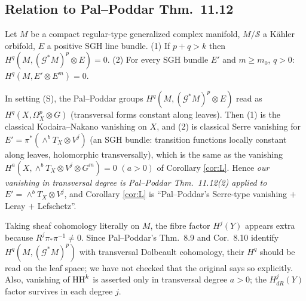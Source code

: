 \subsection{Relation to Pal--Poddar Thm.\ 11.12}\label{sec:PP}
\begin{thm}\tC
Let $M$ be a compact regular-type generalized complex manifold, $M/\mathcal S$ a Kähler orbifold, $E$ a positive SGH line bundle. (1) If $p+q>k$ then $H^q(M,(\mathcal G^*M)^p\otimes E)=0$. (2) For every SGH bundle $E'$ and $m\ge m_0$, $q>0$: $H^q(M,E'\otimes E^m)=0$.
\end{thm}
\begin{prop}\tP\label{prop:PPcompare}
In setting (S), the Pal--Poddar groups $H^q(M,(\mathcal G^*M)^p\otimes E)$ read as $H^q(X,\Omega^p_X\otimes G)$ (transversal forms constant along leaves). Then (1) is the classical Kodaira--Nakano vanishing on $X$, and (2) is classical Serre vanishing for $E'=\pi^*(\wedge^bT_X\otimes V^j)$ (an SGH bundle: transition functions locally constant along leaves, holomorphic transversally), which is the same as the vanishing $H^a(X,\wedge^bT_X\otimes V^j\otimes G^m)=0$ $(a>0)$ of Corollary \ref{cor:L}. Hence \emph{our vanishing in transversal degree is Pal--Poddar Thm.\ 11.12(2) applied to $E'=\wedge^bT_X\otimes V^j$}, and Corollary \ref{cor:L} is ``Pal--Poddar's Serre-type vanishing $+$ Leray $+$ Lefschetz''.
\end{prop}
\begin{rem}[\tQ]
Taking sheaf cohomology literally on $M$, the fibre factor $H^j(Y)$ appears extra because $R^j\pi_*\pi^{-1}\neq0$. Since Pal--Poddar's Thm.\ 8.9 and Cor.\ 8.10 identify $H^q(M,(\mathcal G^*M)^p)$ with transversal Dolbeault cohomology, their $H^q$ should be read on the leaf space; we have not checked that the original says so explicitly. Also, vanishing of $\mathrm{HH}^k$ is asserted only in transversal degree $a>0$; the $H^j_{dR}(Y)$ factor survives in each degree $j$.
\end{rem}

